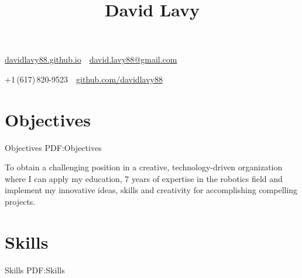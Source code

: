 \documentclass[letterpaper,MMMyyyy,nonstop]{simpleresumecv}
\newcommand{\CVAuthor}{David Lavy}
\newcommand{\CVWebpage}{davidlavy88.github.io}
\newcommand*{\TitleFont}{%
      \usefont{\encodingdefault}{\rmdefault}{bx}{n}%
      \fontsize{20}{24}%
      \selectfont}
\begin{document}

\title{\TitleFont \CVAuthor}

\begin{subtitle}
\href{\CVWebpage}
{\CVWebpage}
\,\SubBulletSymbol\,
\href{mailto:david.lavy88@gmail.com}
{david.lavy88@gmail.com}
\par
+1\,(617)\,820-9523
\,\SubBulletSymbol\,
\href{https://github.com/davidlavy88}
{github.com/davidlavy88}

\end{subtitle}

\begin{body}


\section
{Objectives}
{Objectives}
{PDF:Objectives}

To obtain a challenging position in a creative, technology-driven organization where I can apply my education, 7 years of expertise in the robotics field and implement my innovative ideas, skills and creativity for accomplishing compelling projects.


\section
{Skills}
{Skills}
{PDF:Skills}


\end{body}
\end{document}
